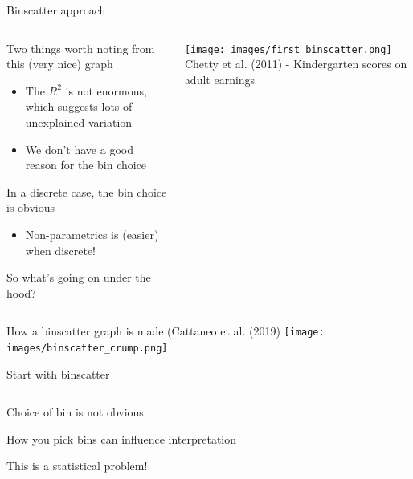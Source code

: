 \documentclass[notes,11pt, aspectratio=169]{beamer}
\newenvironment{wideitemize}{\itemize\addtolength{\itemsep}{10pt}}{\enditemize}
\begin{document}
\begin{frame}{Binscatter approach}
  \begin{columns}[T] %
    \begin{column}{.5\textwidth}
      \begin{wideitemize}
      \item Two things worth noting from this (very nice) graph
        \begin{itemize}
        \item The $R^2$ is not enormous, which suggests lots of unexplained variation
        \item We don't have a good reason for the bin choice
        \end{itemize}
      \item In a discrete case, the bin choice is obvious
        \begin{itemize}
        \item Non-parametrics is (easier) when discrete!
        \end{itemize}
      \item So what's going on under the hood?
  \end{wideitemize}
  \end{column}%
  \hfill%
  \begin{column}{.5\textwidth}
\texttt{[image: images/first\_binscatter.png]}
Chetty et al. (2011) - Kindergarten scores on adult earnings
  \end{column}
\end{columns}
\end{frame}

\begin{frame}{How a binscatter graph is made (Cattaneo et al. (2019)}
  \texttt{[image: images/binscatter\_crump.png]}
\end{frame}


\begin{frame}{Start with binscatter}
  \begin{columns}[T] %
    \begin{column}{.5\textwidth}
      \begin{wideitemize}
      \item<1-> Choice of bin is not obvious
      \item<1-> How you pick bins can influence interpretation
      \item<3-> This is a statistical problem! 
  \end{wideitemize}
  \end{column}%
  \hfill%
  \begin{column}{.5\textwidth}
  \end{column}
\end{columns}
\end{frame}
\end{document}
